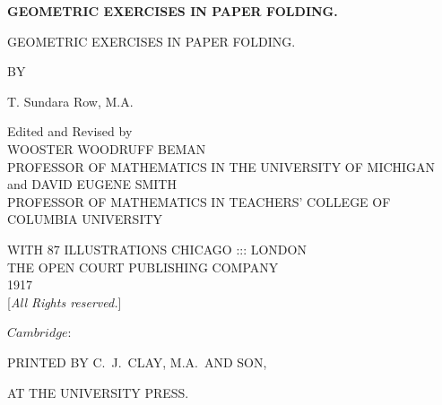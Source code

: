 \documentclass{book}[2021/07/26]
\providecommand{\mathfrak}[1]{#1}
\begin{document}
\begin{frontmatter}
\begin{titlepage}
\begin{center}
\Huge \textbf{GEOMETRIC EXERCISES IN PAPER FOLDING.}
\end{center}
\end{titlepage}

\begin{titlepage}
\begin{center}
\large
\bigskip
{\huge GEOMETRIC EXERCISES IN PAPER FOLDING.}
\bigskip
\bigskip
\bigskip
\bigskip
\bigskip
\bigskip
\vfill

{\normalsize BY}\\
\bigskip

{\LARGE T. Sundara Row, M.A.}\\
\bigskip

Edited and Revised by\\
{\normalsize WOOSTER WOODRUFF BEMAN}\\
{\small PROFESSOR OF MATHEMATICS IN THE UNIVERSITY OF MICHIGAN}
and
{\normalsize DAVID EUGENE SMITH}\\
{\small PROFESSOR OF MATHEMATICS IN TEACHERS’ COLLEGE OF COLUMBIA UNIVERSITY}

\bigskip
\bigskip

\vfill
\bigskip
\bigskip

WITH 87 ILLUSTRATIONS
\vfill
CHICAGO ::: LONDON\\
THE OPEN COURT PUBLISHING COMPANY\\
1917\\

[\textit{All Rights reserved.}]
\end{center}
\end{titlepage}

\begin{center}
\large
$\mathfrak{Cambridge}$:

\normalsize
PRINTED BY C.~J.\ CLAY, M.A.\ AND SON,

AT THE UNIVERSITY PRESS.
\end{center}






\end{frontmatter}
\end{document}
